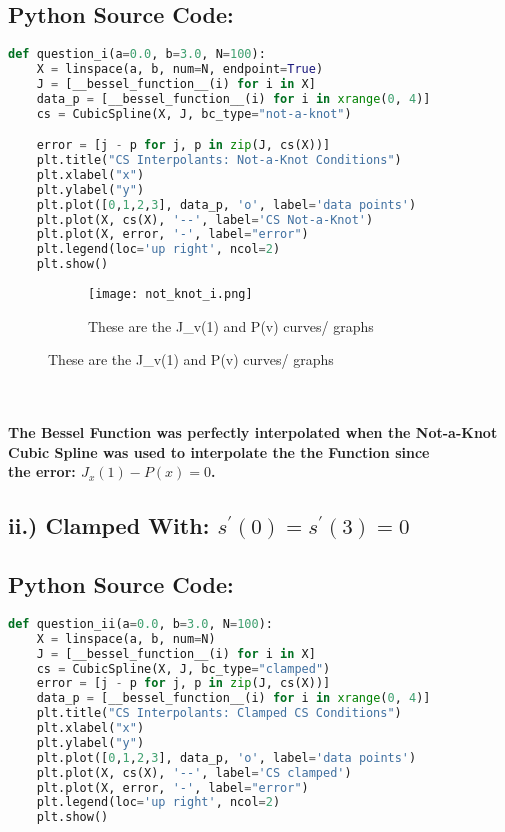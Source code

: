 \documentclass{article}
\begin{document}
\subsection*{Python Source Code:}
\begin{lstlisting}[language=Python]
def question_i(a=0.0, b=3.0, N=100):
    X = linspace(a, b, num=N, endpoint=True)
    J = [__bessel_function__(i) for i in X]
    data_p = [__bessel_function__(i) for i in xrange(0, 4)]
    cs = CubicSpline(X, J, bc_type="not-a-knot")

    error = [j - p for j, p in zip(J, cs(X))]
    plt.title("CS Interpolants: Not-a-Knot Conditions")
    plt.xlabel("x")
    plt.ylabel("y")
    plt.plot([0,1,2,3], data_p, 'o', label='data points')
    plt.plot(X, cs(X), '--', label='CS Not-a-Knot')
    plt.plot(X, error, '-', label="error")
    plt.legend(loc='up right', ncol=2)
    plt.show()
\end{lstlisting}


\begin{figure}[h!]
  \centering
  \begin{subfigure}{\linewidth}
    \texttt{[image: not\_knot\_i.png]}
    \caption{These are the J_v(1) and P(v) curves/ graphs }
  \end{subfigure}
\end{figure}

\textbf{ \\ \\ The Bessel Function was perfectly interpolated when the Not-a-Knot Cubic Spline was used to interpolate the the Function since\\
                the error:  $J_x(1) - P(x) = 0 $.}

\pagebreak


\subsection*{ii.) Clamped With: $s^' (0) = s^' (3) = 0$}
\subsection*{Python Source Code:}
\begin{lstlisting}[language=Python]
def question_ii(a=0.0, b=3.0, N=100):
    X = linspace(a, b, num=N)
    J = [__bessel_function__(i) for i in X]
    cs = CubicSpline(X, J, bc_type="clamped")
    error = [j - p for j, p in zip(J, cs(X))]
    data_p = [__bessel_function__(i) for i in xrange(0, 4)]
    plt.title("CS Interpolants: Clamped CS Conditions")
    plt.xlabel("x")
    plt.ylabel("y")
    plt.plot([0,1,2,3], data_p, 'o', label='data points')
    plt.plot(X, cs(X), '--', label='CS clamped')
    plt.plot(X, error, '-', label="error")
    plt.legend(loc='up right', ncol=2)
    plt.show()
\end{lstlisting}
\end{document}
